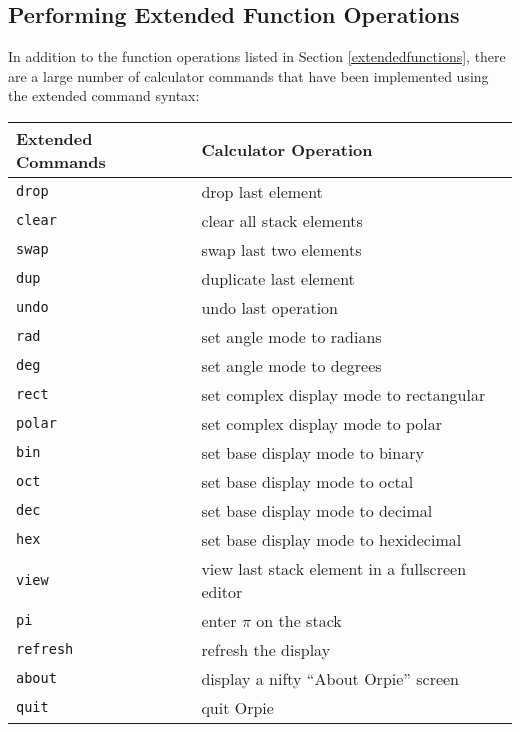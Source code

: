 \documentclass[11pt,notitlepage]{article}
\begin{document}
\subsection{Performing Extended Function Operations}
In addition to the function operations listed in Section
\ref{extendedfunctions}, there are a large number of calculator commands that
have been implemented using the extended command syntax:
\begin{center}
   \begin{tabular}[t]{|l|l|}
      \hline Extended Commands & Calculator Operation \\
      \hline
      {\tt drop} & drop last element \\
      {\tt clear} & clear all stack elements \\
      {\tt swap} & swap last two elements \\
      {\tt dup} & duplicate last element \\
      {\tt undo} & undo last operation \\
      {\tt rad} & set angle mode to radians \\
      {\tt deg} & set angle mode to degrees \\
      {\tt rect} & set complex display mode to rectangular \\
      {\tt polar} & set complex display mode to polar \\
      {\tt bin} & set base display mode to binary \\
      {\tt oct} & set base display mode to octal \\
      {\tt dec} & set base display mode to decimal \\
      {\tt hex} & set base display mode to hexidecimal \\
      {\tt view} & view last stack element in a fullscreen editor \\
      {\tt pi} & enter $\pi$ on the stack \\
      {\tt refresh} & refresh the display \\
      {\tt about} & display a nifty ``About Orpie'' screen \\
      {\tt quit} & quit Orpie \\
      \hline
   \end{tabular}
\end{center}
\end{document}
